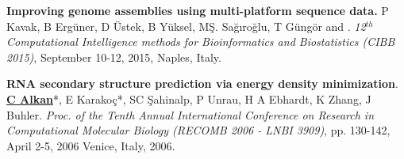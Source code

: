 \vspace{-.2cm}

{\bf Improving genome assemblies using multi-platform sequence data.}
P Kavak, B Ergüner, D Üstek, B Yüksel, MŞ. Sağıroğlu, T Güngör and \calkan{}.
{\em 12$^{th}$ Computational Intelligence methods for Bioinformatics and Biostatistics (CIBB 2015)}, 
 September 10-12, 2015, Naples, Italy.










\vspace{-.2cm}
{\bf RNA secondary structure prediction via energy density minimization}.
{\bf {\underline{C Alkan}}}*, E Karako\c{c}*, SC \c{S}ahinalp, P Unrau,
H A Ebhardt, K Zhang, J Buhler.
{\em Proc. of the Tenth Annual International Conference on Research in Computational Molecular Biology
  (RECOMB 2006 - LNBI 3909)}, pp. 130-142,
  April 2-5, 2006 Venice, Italy, 2006.


